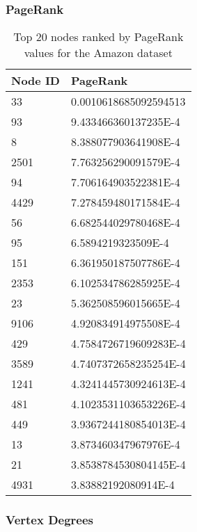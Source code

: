 \subsubsection{PageRank}

\begin{table}%
\centering
\begin{tabular}{|l|l|}
\hline
Node ID & PageRank \\
\hline
33 & 0.0010618685092594513 \\
93 & 9.433466360137235E-4 \\
8 & 8.388077903641908E-4 \\
2501 & 7.763256290091579E-4 \\
94 & 7.706164903522381E-4 \\
4429 & 7.278459480171584E-4 \\
56 & 6.682544029780468E-4 \\
95 & 6.5894219323509E-4 \\
151 & 6.361950187507786E-4 \\
2353 & 6.102534786285925E-4 \\
23 & 5.362508596015665E-4 \\
9106 & 4.920834914975508E-4 \\
429 & 4.7584726719609283E-4 \\
3589 & 4.7407372658235254E-4 \\
1241 & 4.3241445730924613E-4 \\
481 & 4.1023531103653226E-4 \\
449 & 3.9367244180854013E-4 \\
13 & 3.873460347967976E-4 \\
21 & 3.8538784530804145E-4 \\
4931 & 3.83882192080914E-4 \\
\hline
\end{tabular}
\caption{Top 20 nodes ranked by PageRank values for the Amazon dataset}
\label{tab:amazonpr}
\end{table}

\subsubsection{Vertex Degrees}

